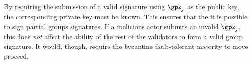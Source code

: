By requiring the submission of a valid signature using $\gpk_{j}$
as the public key, the corresponding private key must be known.
This ensures that the it is possible to sign partial groups signatures.
If a malicious actor submits an invalid $\gpk_{j}$,
this does \emph{not} affect the ability of the rest of the validators
to form a valid group signature.
It would, though, require the byzantine fault-tolerant majority
to move proceed.





